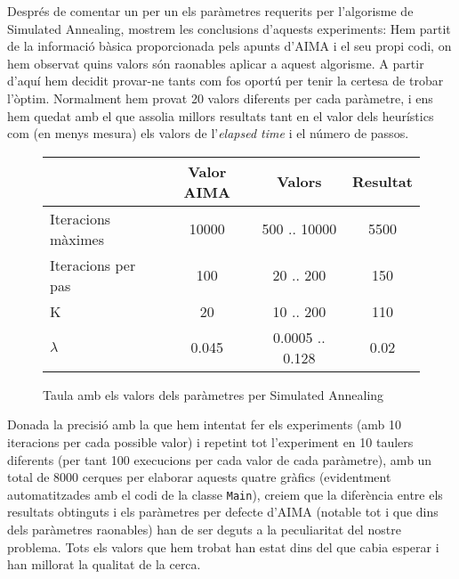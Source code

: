 Després de comentar un per un els paràmetres requerits per l'algorisme de Simulated Annealing, mostrem les conclusions d'aquests experiments: Hem partit de la informació bàsica proporcionada pels apunts d'AIMA i el seu propi codi, on hem observat quins valors són raonables aplicar a aquest algorisme. A partir d'aquí hem decidit provar-ne tants com fos oportú per tenir la certesa de trobar l'òptim. Normalment hem provat 20 valors diferents per cada paràmetre, i ens hem quedat amb el que assolia millors resultats tant en el valor dels heurístics com (en menys mesura) els valors de l'\emph{elapsed time} i el número de passos.
\begin{figure}[ht]
  \caption{Taula amb els valors dels paràmetres per Simulated Annealing}
	\label{fig:resumSA}
  \begin{center}
    \begin{tabular}{| l | c | c | c |}
      \hline
      						& \textbf{Valor AIMA}    & \textbf{Valors} & \textbf{Resultat} \\ \hline
      Iteracions màximes 	& 10000 & 500 .. 10000 		& 5500 \\ \hline
      Iteracions per pas 	& 100 	& 20 .. 200 		& 150 \\ \hline
      K 					& 20 	& 10 .. 200 		& 110 \\ \hline
      $\lambda$ 			& 0.045 & 0.0005 .. 0.128 	& 0.02 \\ \hline
    \end{tabular}
  \end{center}
\end{figure}

Donada la precisió amb la que hem intentat fer els experiments (amb 10 iteracions per cada possible valor) i repetint tot l'experiment en 10 taulers diferents (per tant 100 execucions per cada valor de cada paràmetre), amb un total de 8000 cerques per elaborar aquests quatre gràfics (evidentment automatitzades amb el codi de la classe \texttt{Main}), creiem que la diferència entre els resultats obtinguts i els paràmetres per defecte d'AIMA (notable tot i que dins dels paràmetres raonables) han de ser deguts a la peculiaritat del nostre problema. Tots els valors que hem trobat han estat dins del que cabia esperar i han millorat la qualitat de la cerca.

\newpage
